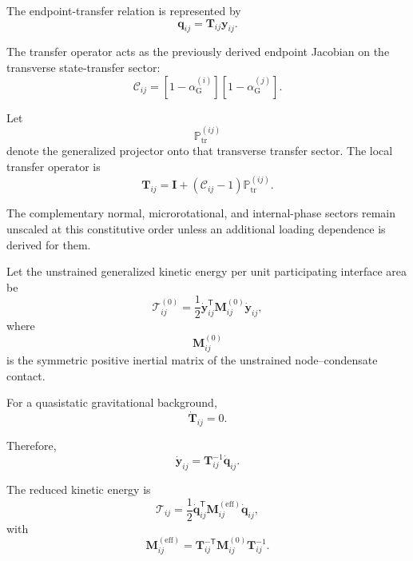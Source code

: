 The endpoint-transfer relation is represented by
\begin{equation}
    \boxed{ \mathbf{q}_{ij} = \mathbf{T}_{ij}\mathbf{y}_{ij} }.
\end{equation}

The transfer operator acts as the previously derived endpoint Jacobian on the transverse state-transfer sector:
\begin{equation}
    \mathcal{C}_{ij} = \left[ 1-\alpha_{\mathrm{G}}^{(i)} \right] \left[ 1-\alpha_{\mathrm{G}}^{(j)} \right].
\end{equation}

Let
\begin{equation}
    \mathbb{P}_{\mathrm{tr}}^{(ij)}
\end{equation}
denote the generalized projector onto that transverse transfer sector. The local transfer operator is
\begin{equation}
    \boxed{ \mathbf{T}_{ij} = \mathbf{I} + \left( \mathcal{C}_{ij}-1 \right) \mathbb{P}_{\mathrm{tr}}^{(ij)} }.
\end{equation}

The complementary normal, microrotational, and internal-phase sectors remain unscaled at this constitutive order unless an additional loading dependence is derived for them.

Let the unstrained generalized kinetic energy per unit participating interface area be
\begin{equation}
    \mathcal{T}_{ij}^{(0)} = \frac{1}{2} \dot{\mathbf{y}}_{ij}^{\mathsf{T}} \mathbf{M}_{ij}^{(0)} \dot{\mathbf{y}}_{ij},
\end{equation}
where
\begin{equation}
    \mathbf{M}_{ij}^{(0)}
\end{equation}
is the symmetric positive inertial matrix of the unstrained node--condensate contact.

For a quasistatic gravitational background,
\begin{equation}
    \dot{\mathbf{T}}_{ij} = 0.
\end{equation}

Therefore,
\begin{equation}
    \dot{\mathbf{y}}_{ij} = \mathbf{T}_{ij}^{-1} \dot{\mathbf{q}}_{ij}.
\end{equation}

The reduced kinetic energy is
\begin{equation}
    \mathcal{T}_{ij} = \frac{1}{2} \dot{\mathbf{q}}_{ij}^{\mathsf{T}} \mathbf{M}_{ij}^{(\mathrm{eff})} \dot{\mathbf{q}}_{ij},
\end{equation}
with
\begin{equation}
    \boxed{ \mathbf{M}_{ij}^{(\mathrm{eff})} = \mathbf{T}_{ij}^{-\mathsf{T}} \mathbf{M}_{ij}^{(0)} \mathbf{T}_{ij}^{-1} }.
\end{equation}

